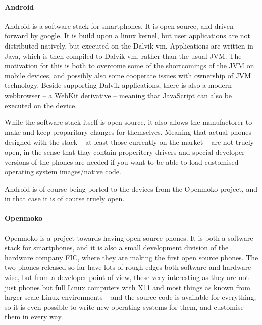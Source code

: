 \documentclass[11pt]{report}
\begin{document}
\paragraph{Android}

Android is a software stack for smartphones. It is open source, and driven forward by google.
It is build upon a linux kernel, but user applications are not distributed natively, but executed on the Dalvik vm. Applications are written in Java, which is then compiled to Dalvik vm, rather than the usual JVM. The motivation for this is both to overcome some of the shortcomings of the JVM on mobile devices, and possibly also some cooperate issues with ownership of JVM technology.
Beside supporting Dalvik applications, there is also a modern webbrowser -- a WebKit derivative -- meaning that JavaScript can also be executed on the device.

While the software stack itself is open source, it also allows the manufactorer to make and keep proparitary changes for themselves. 
Meaning that actual phones designed with the stack -- at least those currently on the market -- are not truely open, in the sense that thay contain properitery drivers and special developer-versions of the phones are needed if you want to be able to load customised operating system images/native code.

Android is of course being ported to the devices from the Openmoko project, and in that case it is of course truely open.

\paragraph{Openmoko}
Openmoko is a project towards having open source phones.
It is both a software stack for smartphones, and it is also a small development division of the hardware company FIC, where they are making the first open source phones.
The two phones released so far have lots of rough edges both software and hardware wise, but from a developer point of view, these very interesting as they are not just phones but full Linux computers with X11 and most things as known from larger scale Linux environments -- and the source code is available for everything, so it is even possible to write new operating systems for them, and customise them in every way.


\end{document}

